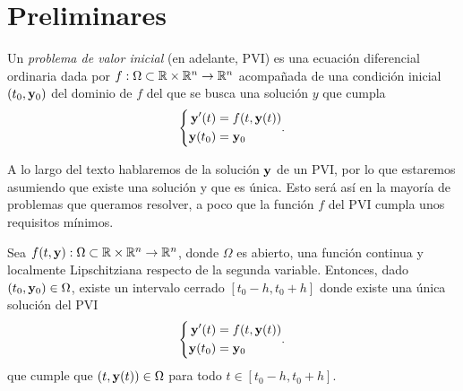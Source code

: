 \section{Preliminares}

\begin{definition}\label{eqn:pvi}
    Un \emph{problema de valor inicial} (en adelante, PVI)
    es una ecuación diferencial ordinaria dada por
    $f : \Omega \subset \mathbb{R} \times \mathbb{R}^n \to \mathbb{R}^n$
    acompañada de una condición inicial $(t_0, \vb{y}_0)$ del dominio de $f$
    del que se busca una solución $y$ que cumpla
    \begin{equation*}
        \left\{
        \begin{aligned}
            \vb{y}'(t) &= f(t, \vb{y}(t)) \\
            \vb{y}(t_0) &= \vb{y}_0 \\
        \end{aligned}.
        \right.
    \end{equation*}
\end{definition}


A lo largo del texto hablaremos de la solución $\vb{y}$ de un PVI,
por lo que estaremos asumiendo que existe una solución y que es única.
Esto será así en la mayoría de problemas que queramos resolver,
a poco que la función $f$ del PVI cumpla unos requisitos mínimos.

\begin{theorem}
    Sea $f(t, \vb{y}) : \Omega \subset \mathbb{R} \times \mathbb{R}^n \to \mathbb{R}^n$,
    donde $\Omega$ es abierto,
    una función continua y
    localmente Lipschitziana respecto de la segunda variable.
    Entonces, dado $(t_0, \vb{y}_0) \in \Omega$,
    existe un intervalo cerrado $[t_0 - h, t_0 + h]$
    donde existe una única solución del PVI
    \begin{equation*}
        \left\{
        \begin{aligned}
            \vb{y}'(t) &= f(t, \vb{y}(t)) \\
            \vb{y}(t_0) &= \vb{y}_0 \\
        \end{aligned}.
        \right.
    \end{equation*}
    que cumple que $(t, \vb{y}(t)) \in \Omega$ para todo $t \in [t_0 - h, t_0 + h]$.
\end{theorem}

